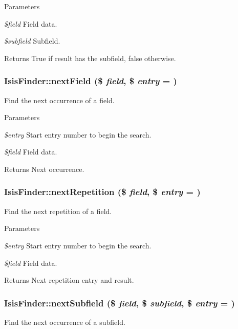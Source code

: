 \begin{DoxyParams}{Parameters}
\item[{\em \$field}]Field data.\item[{\em \$subfield}]Subfield.\end{DoxyParams}
\begin{DoxyReturn}{Returns}
True if result has the subfield, false otherwise. 
\end{DoxyReturn}
\hypertarget{classIsisFinder_a7d708e281bea35ee38f5875c8f2cad8d}{
\subsubsection[{nextField}]{\setlength{\rightskip}{0pt plus 5cm}IsisFinder::nextField (\$ {\em field}, \/  \$ {\em entry} = {})}}
\label{classIsisFinder_a7d708e281bea35ee38f5875c8f2cad8d}
Find the next occurrence of a field.


\begin{DoxyParams}{Parameters}
\item[{\em \$entry}]Start entry number to begin the search.\item[{\em \$field}]Field data.\end{DoxyParams}
\begin{DoxyReturn}{Returns}
Next occurrence. 
\end{DoxyReturn}
\hypertarget{classIsisFinder_ac4e3a8f45995cbf940b3f2899b71bd1e}{
\subsubsection[{nextRepetition}]{\setlength{\rightskip}{0pt plus 5cm}IsisFinder::nextRepetition (\$ {\em field}, \/  \$ {\em entry} = {})}}
\label{classIsisFinder_ac4e3a8f45995cbf940b3f2899b71bd1e}
Find the next repetition of a field.


\begin{DoxyParams}{Parameters}
\item[{\em \$entry}]Start entry number to begin the search.\item[{\em \$field}]Field data.\end{DoxyParams}
\begin{DoxyReturn}{Returns}
Next repetition entry and result. 
\end{DoxyReturn}
\hypertarget{classIsisFinder_aa367980783d341197e003684a639ff1a}{
\subsubsection[{nextSubfield}]{\setlength{\rightskip}{0pt plus 5cm}IsisFinder::nextSubfield (\$ {\em field}, \/  \$ {\em subfield}, \/  \$ {\em entry} = {})}}
\label{classIsisFinder_aa367980783d341197e003684a639ff1a}
Find the next occurrence of a subfield.


